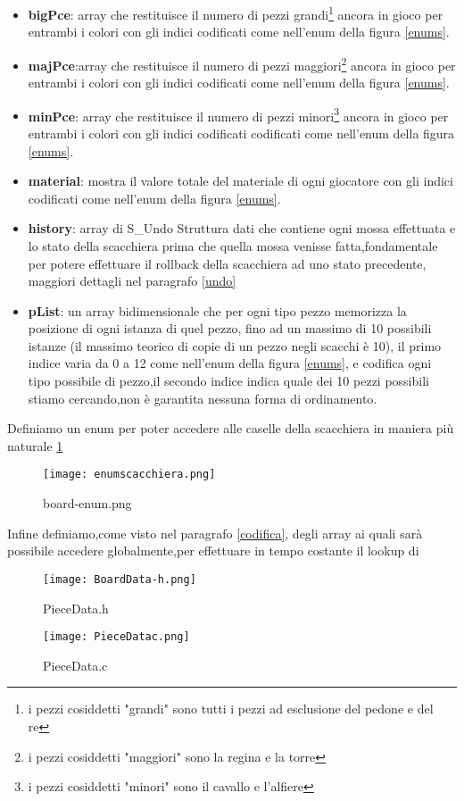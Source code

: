 \begin{itemize}
    \item \textbf{bigPce}: array che restituisce il numero di pezzi grandi\footnote{i pezzi cosiddetti "grandi" sono tutti i pezzi ad esclusione del pedone e del re} ancora in gioco  per entrambi i colori con gli indici codificati  come nell'enum della figura \ref{enums}.
    \item \textbf{majPce}:array che restituisce il numero di pezzi maggiori\footnote{i pezzi cosiddetti "maggiori" sono la regina e la torre} ancora in gioco  per entrambi i colori con gli indici codificati come nell'enum della figura \ref{enums}.
    \item \textbf{minPce}: array che restituisce il numero di pezzi minori\footnote{i pezzi cosiddetti "minori" sono il cavallo e l'alfiere} ancora in gioco  per entrambi i colori con gli indici codificati codificati come nell'enum della figura \ref{enums}.
    \item \textbf{material}: mostra il valore totale del materiale di ogni giocatore con gli indici codificati  come nell'enum della figura \ref{enums}.
    \item \textbf{history}: array di S\_Undo Struttura dati che contiene ogni mossa effettuata e lo stato della scacchiera prima che quella mossa venisse fatta,fondamentale per potere effettuare
          il rollback della scacchiera ad uno stato precedente, maggiori dettagli nel paragrafo \ref{undo}
    \item \textbf{pList}: un array bidimensionale  che per ogni tipo  pezzo memorizza la posizione di ogni istanza di quel pezzo, fino ad un massimo di 10 possibili istanze (il massimo teorico di copie di un pezzo negli scacchi è 10),
          il primo indice varia da 0 a 12 come nell'enum della figura \ref{enums}, e codifica ogni tipo possibile di pezzo,il secondo indice indica quale dei 10 pezzi possibili stiamo cercando,non è garantita nessuna forma
          di ordinamento.
\end{itemize}

Definiamo un enum per poter accedere alle caselle della scacchiera in maniera più naturale \ref{boardenum}
\begin{figure}[H]
    \centering
    \texttt{[image: enumscacchiera.png]}
    \caption{ board-enum.png}
    \label{boardenum}
\end{figure}

Infine definiamo,come visto nel paragrafo \ref{codifica}, degli array ai quali sarà possibile accedere globalmente,per effettuare in tempo costante il lookup di
\begin{figure}[!tbp]
    \centering
    \begin{minipage}{0.4\textwidth}
        \texttt{[image: BoardData-h.png]}
        \caption{PieceData.h}
    \end{minipage}
    \hfill
    \begin{minipage}{0.4\textwidth}
        \texttt{[image: PieceDatac.png]}
        \caption{PieceData.c}
    \end{minipage}
\end{figure}



